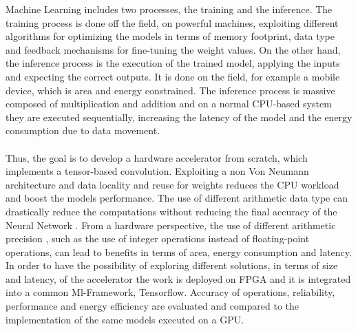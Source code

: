 Machine Learning includes two processes, the training and the inference. The training process is done off the field, on powerful machines, exploiting different algorithms for optimizing the models in terms of memory footprint, data type and feedback mechanisms for fine-tuning the weight values. On the other hand, the inference process is the execution of the trained model, applying the inputs and expecting the correct outputs. It is done on the field, for example a mobile device, which is area and energy constrained. The inference process is massive composed of multiplication and addition and on a normal CPU-based system they are executed sequentially, increasing the latency of the model and the energy consumption due to data movement.\\\\
Thus, the goal is to develop a hardware accelerator from scratch, which implements a tensor-based convolution. Exploiting a non Von Neumann architecture and data locality and reuse for weights reduces the CPU workload and boost the models performance. The use of different arithmetic data type can drastically reduce the computations without reducing the final accuracy of the Neural Network  \cite{paper:8} \cite{paper:7}. From a hardware perspective, the use of different arithmetic precision \cite{paper:14}, such as the use of integer operations instead of floating-point operations, can lead to benefits in terms of area, energy consumption and latency.\\

In order to have the possibility of exploring different solutions, in terms of size and latency, of the accelerator the work is deployed on FPGA and it is integrated into a common Ml-Framework, Tensorflow. Accuracy of operations, reliability, performance and energy efficiency are evaluated and compared to the implementation of the same models executed on a GPU.